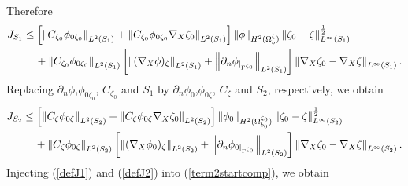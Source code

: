 \documentclass[11pt]{article}
\begin{document}
Therefore
\begin{equation}\label{defJ1}
	\begin{split}
		J_{S_1}&\leq\left[  \left\Vert C_{\zeta_0}\phi_{0\zeta_0} \right\Vert_{L^2(S_1)}+ \left\Vert  C_{\zeta_0}\phi_{0\zeta_0} \nabla_X\zeta_0\right\Vert_{L^2(S_1)} \right]\left\Vert \phi  \right\Vert_{H^2(\Omega_b^{\zeta})}  \left\Vert   \zeta_0-\zeta\right\Vert_{L^{\infty}(S_1)}^{\frac{1}{2}}\\
		&\hspace{0.4cm}+\left\Vert C_{\zeta_0} \phi_{0\zeta_0} \right\Vert_{L^2(S_1)}\left[  \left\Vert  (\nabla_X\phi)_{\zeta}\right\Vert_{L^2(S_1)}+ \left\Vert \partial_n\phi_{|_{\Gamma^{\zeta_0}}} \right\Vert_{L^2(S_1)} \right]\left\Vert\nabla_X\zeta_0-\nabla_X\zeta  \right\Vert_{L^{\infty}(S_1)}.
	\end{split}
\end{equation}
Replacing $\partial_n\phi$,$\phi_{0\zeta_0}$, $C_{\zeta_0}$ and $S_1$ by $\partial_n\phi_0$,$\phi_{0\zeta}$, $C_{\zeta}$ and $S_2$, respectively, we obtain 
\begin{equation}\label{defJ2}
	\begin{split}
		J_{S_2}&\leq\left[  \left\Vert C_{\zeta}\phi_{0\zeta} \right\Vert_{L^2(S_2)}+ \left\Vert C_{\zeta}  \phi_{0\zeta}\nabla_X\zeta_0\right\Vert_{L^2(S_2)} \right]\left\Vert \phi_0  \right\Vert_{H^2(\Omega_{b_0}^{\zeta_0})}  \left\Vert   \zeta_0-\zeta\right\Vert_{L^{\infty}(S_2)}^{\frac{1}{2}}\\
		&\hspace{0.4cm}+\left\Vert  C_{\zeta}\phi_{0\zeta} \right\Vert_{L^2(S_2)}\left[  \left\Vert  (\nabla_X\phi_0)_{\zeta}\right\Vert_{L^2(S_2)}+ \left\Vert \partial_n\phi_{0|_{\Gamma^{\zeta_0}}} \right\Vert_{L^2(S_2)} \right]\left\Vert\nabla_X\zeta_0-\nabla_X\zeta  \right\Vert_{L^{\infty}(S_2)}.
	\end{split}
\end{equation}
Injecting (\ref{defJ1}) and (\ref{defJ2}) into (\ref{term2startcomp}), we obtain  
\end{document}
